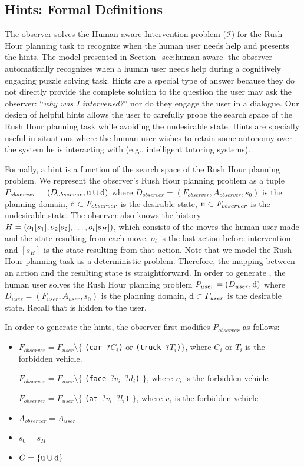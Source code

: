 \subsection{Hints: Formal Definitions}
The observer solves the Human-aware Intervention problem ($\mathcal{I}$) for the Rush Hour planning task to recognize when the human user needs help and presents the hints.
The model presented in Section~\ref{sec:human-aware} the observer automatically recognizes when a human user needs help during a cognitively engaging puzzle solving task.
Hints are a special type of answer because they do not directly provide the complete solution to the question the user may ask the observer: ``\textit{why was I intervened?}'' nor do they engage the user in a dialogue. 
Our design of helpful hints allows the user to carefully probe the search space of the Rush Hour planning task while avoiding the undesirable state. 
Hints are specially useful in situations where the human user wishes to retain some autonomy over the system he is interacting with (e.g., intelligent tutoring systems).

\sloppy
Formally, a hint is a function of the search space of the Rush Hour planning problem. 
We represent the observer's Rush Hour planning problem as a tuple $P_{observer}=(D_{observer}, \mathrm{u}\cup\mathrm{d})$ where $D_{observer}=(F_{observer}, A_{observer}, s_0)$ is the planning domain, $\mathrm{d} \subset F_{observer}$ is the desirable state, $\mathrm{u} \subset F_{observer}$ is the undesirable state.
The observer also knows the history $H=(o_1[s_1], o_2[s_2], \ldots, o_{i}[s_H])$, which consists of the moves the human user made and the state resulting from each move.
$o_i$ is the last action before intervention and $[s_H]$ is the state resulting from that action.
Note that we model the Rush Hour planning task as a deterministic problem. 
Therefore, the mapping between an action and the resulting state is straightforward.
In order to generate \historyDef, the human user solves the Rush Hour planning problem $P_{user} = (D_{user}, \mathrm{d})$ where $D_{user}=(F_{user}, A_{user}, s_0)$ is the planning domain, $\mathrm{d} \subset F_{user}$ is the desirable state. 
Recall that \undesired is hidden to the user.

In order to generate the hints, the observer first modifies $P_{observer}$ as follows:
\begin{itemize}
\item $F_{observer} = F_{user} \setminus \lbrace$ \texttt{(car ?$C_i$)} or \texttt{(truck ?$T_i$)}$\rbrace$, where $C_i$ or $T_i$ is the forbidden vehicle.

$F_{observer} = F_{user} \setminus \lbrace$ \texttt{(face $?v_i$ $?d_i$)} $\rbrace$, where $v_i$ is the forbidden vehicle

$F_{observer} = F_{user} \setminus \lbrace$ \texttt{(at $?v_i$ $?l_i$)} $\rbrace$, where $v_i$ is the forbidden vehicle

\item $A_{observer} = A_{user}$
\item $s_0 = s_H$
\item $G= \lbrace \mathrm{u}\cup\mathrm{d} \rbrace$
\end{itemize}

